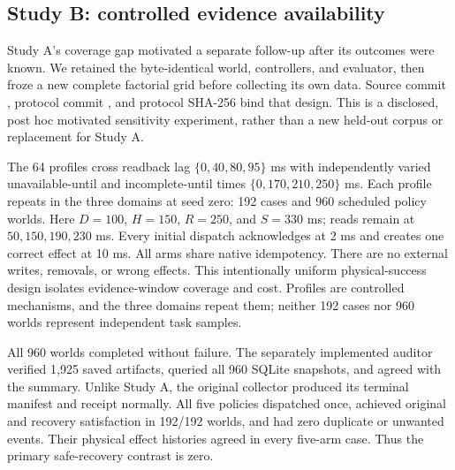 \subsection{Study B: controlled evidence availability}

Study A's coverage gap motivated a separate follow-up after its outcomes were known. We retained the byte-identical world, controllers, and evaluator, then froze a new complete factorial grid before collecting its own data. Source commit \texttt{}, protocol commit \texttt{}, and protocol SHA-256 \texttt{} bind that design. This is a disclosed, post hoc motivated sensitivity experiment, rather than a new held-out corpus or replacement for Study A.

The 64 profiles cross readback lag $\{0,40,80,95\}$ ms with independently varied unavailable-until and incomplete-until times $\{0,170,210,250\}$ ms. Each profile repeats in the three domains at seed zero: 192 cases and 960 scheduled policy worlds. Here $D=100$, $H=150$, $R=250$, and $S=330$ ms; reads remain at $50,150,190,230$ ms. Every initial dispatch acknowledges at 2 ms and creates one correct effect at 10 ms. All arms share native idempotency. There are no external writes, removals, or wrong effects. This intentionally uniform physical-success design isolates evidence-window coverage and cost. Profiles are controlled mechanisms, and the three domains repeat them; neither 192 cases nor 960 worlds represent independent task samples.

All 960 worlds completed without failure. The separately implemented auditor verified 1,925 saved artifacts, queried all 960 SQLite snapshots, and agreed with the summary. Unlike Study A, the original collector produced its terminal manifest and receipt normally. All five policies dispatched once, achieved original and recovery satisfaction in 192/192 worlds, and had zero duplicate or unwanted events. Their physical effect histories agreed in every five-arm case. Thus the primary safe-recovery contrast is zero.

